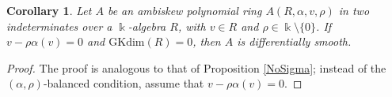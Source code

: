 \documentclass[10pt,a4paper]{amsart}
\newtheorem{corollary}{Corollary}
\begin{document}
\begin{corollary}\label{Cor37}
Let $A$ be an ambiskew polynomial ring $A(R, \alpha, v, \rho)$ in two indeterminates over a $\Bbbk$-algebra $R$, with $v\in R$ and $\rho\in\Bbbk\setminus\{0\}$. If $v-\rho\alpha(v)=0$ and $\text{GKdim}(R)=0$, then $A$ is differentially smooth.
\end{corollary}

\begin{proof}
The proof is analogous to that of Proposition \ref{NoSigma}; instead of the $(\alpha,\rho)$-balanced condition, assume that $v-\rho\alpha(v)=0$.
\end{proof}
\end{document}
